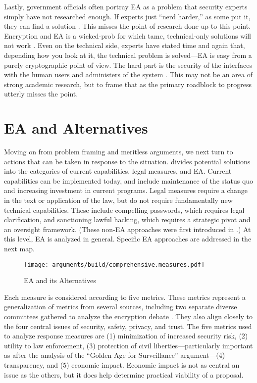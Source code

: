 Lastly, government officials often portray \ac{EA} as a problem that security experts simply have not researched enough.
If experts just ``nerd harder,'' as some put it, they can find a solution \cite{schneier_2019}. This misses the point of
research done up to this point. Encryption and \ac{EA} is a \ac{wicked-prob} for which tame, technical-only solutions
will not work \cite{rozenshtein_wicked_2018}. Even on the technical side, experts have stated time and again that,
depending how you look at it, the technical problem is solved---\ac{EA} is easy from a purely cryptographic point of
view. The hard part is the security of the interfaces with the human users and administers of the system
\cite{abelson_risks_1997} \cite{abelson_2015}. This may not be an area of strong academic research, but to frame that
as the primary roadblock to progress utterly misses the point.


\section{EA and Alternatives}

Moving on from problem framing and meritless arguments, we next turn to actions that can be taken in response to the
situation.  divides potential solutions into the categories of current capabilities, legal
measures, and \ac{EA}. Current capabilities can be implemented today, and include maintenance of the status quo and
increasing investment in current programs. Legal measures require a change in the text or application of the law, but do
not require fundamentally new technical capabilities. These include compelling passwords, which requires legal
clarification, and sanctioning lawful hacking, which requires a strategic pivot and an oversight framework. (These
non-\ac{EA} approaches were first introduced in .) At this level, \ac{EA} is analyzed in
general. Specific EA approaches are addressed in the next map.

\begin{sidewaysfigure}
  \centering\CaptionFontSize
  \texttt{[image: arguments/build/comprehensive.measures.pdf]}
  \caption{EA and its Alternatives}
  \label{fig-arg-measures}
\end{sidewaysfigure}

Each measure is considered according to five metrics. These metrics represent a generalization of metrics from several
sources, including two separate diverse committees gathered to analyze the encryption debate
\cite{committee_decrypting_2018} \cite{group_2019} \cite{varia_2018}. They also align closely to the four central issues
of security, safety, privacy, and trust. The five metrics used to analyze response measures are (1) minimization of
increased security risk, (2) utility to law enforcement, (3) protection of civil liberties---particularly important as
after the analysis of the ``Golden Age for Surveillance'' argument---(4) transparency, and (5) economic impact. Economic
impact is not as central an issue as the others, but it does help determine practical viability of a proposal.

